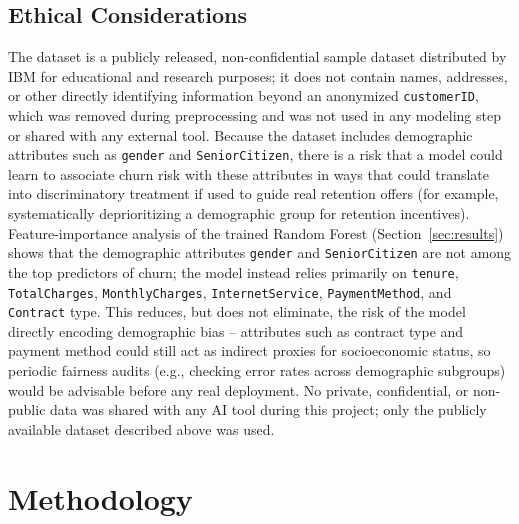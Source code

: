 \documentclass[conference]{IEEEtran}
\begin{document}
	\subsection{Ethical Considerations}
	The dataset is a publicly released, non-confidential sample dataset distributed by IBM for educational and research purposes; it does not contain names, addresses, or other directly identifying information beyond an anonymized \texttt{customerID}, which was removed during preprocessing and was not used in any modeling step or shared with any external tool. Because the dataset includes demographic attributes such as \texttt{gender} and \texttt{SeniorCitizen}, there is a risk that a model could learn to associate churn risk with these attributes in ways that could translate into discriminatory treatment if used to guide real retention offers (for example, systematically deprioritizing a demographic group for retention incentives). Feature-importance analysis of the trained Random Forest (Section~\ref{sec:results}) shows that the demographic attributes \texttt{gender} and \texttt{SeniorCitizen} are not among the top predictors of churn; the model instead relies primarily on \texttt{tenure}, \texttt{TotalCharges}, \texttt{MonthlyCharges}, \texttt{InternetService}, \texttt{PaymentMethod}, and \texttt{Contract} type. This reduces, but does not eliminate, the risk of the model directly encoding demographic bias -- attributes such as contract type and payment method could still act as indirect proxies for socioeconomic status, so periodic fairness audits (e.g., checking error rates across demographic subgroups) would be advisable before any real deployment. No private, confidential, or non-public data was shared with any AI tool during this project; only the publicly available dataset described above was used.
	
	\section{Methodology}
	\label{sec:methodology}
	
\end{document}

